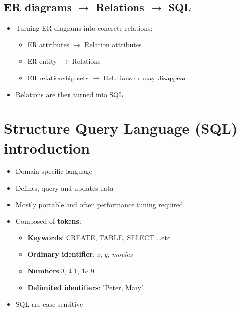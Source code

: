 \documentclass[conference]{IEEEtran}
\begin{document}
\pagebreak

\subsection{ER diagrams $\rightarrow$ Relations $\rightarrow$ SQL}

\begin{itemize}
    \item Turning ER diagrams into concrete relations:
    \begin{itemize}
        \item ER attributes $\rightarrow$ Relation attributes 
        \item ER entity $\rightarrow$ Relations 
        \item ER relationship sets $\rightarrow$ Relations or may disappear 
    \end{itemize}

    \item Relations are then turned into SQL
\end{itemize}

\section{\textbf{Structure Query Language (SQL) introduction}}

\begin{itemize}
    \item Domain specific language
    \item Defines, query and updates data
    \item Mostly portable and often performance tuning required
    \item Composed of \textbf{tokens}:
    \begin{itemize}
        \item \textbf{Keywords}: CREATE, TABLE, SELECT \dots etc
        \item \textbf{Ordinary identifier}: \textit{x}, \textit{y}, \textit{movies}
        \item \textbf{Numbers}:3, 4.1, 1e-9
        \item \textbf{Delimited identifiers}: "Peter, Mary"
    \end{itemize}
    \item  SQL are case-sensitive
\end{itemize}
\end{document}
